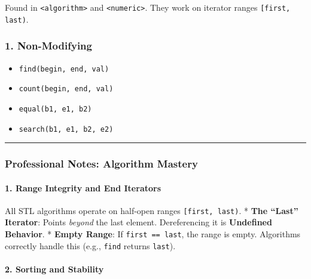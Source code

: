 Found in \passthrough{\lstinline!<algorithm>!} and
\passthrough{\lstinline!<numeric>!}. They work on iterator ranges
\passthrough{\lstinline![first, last)!}.

\hypertarget{non-modifying}{%
\subsubsection{1. Non-Modifying}\label{non-modifying}}

\begin{itemize}
\tightlist
\item
  \passthrough{\lstinline!find(begin, end, val)!}
\item
  \passthrough{\lstinline!count(begin, end, val)!}
\item
  \passthrough{\lstinline!equal(b1, e1, b2)!}
\item
  \passthrough{\lstinline!search(b1, e1, b2, e2)!}
\end{itemize}

\begin{center}\rule{0.5\linewidth}{0.5pt}\end{center}

\hypertarget{professional-notes-algorithm-mastery}{%
\subsubsection{Professional Notes: Algorithm
Mastery}\label{professional-notes-algorithm-mastery}}

\hypertarget{range-integrity-and-end-iterators}{%
\paragraph{1. Range Integrity and End
Iterators}\label{range-integrity-and-end-iterators}}

All STL algorithms operate on half-open ranges
\passthrough{\lstinline![first, last)!}. * \textbf{The ``Last''
Iterator}: Points \emph{beyond} the last element. Dereferencing it is
\textbf{Undefined Behavior}. * \textbf{Empty Range}: If
\passthrough{\lstinline!first == last!}, the range is empty. Algorithms
correctly handle this (e.g., \passthrough{\lstinline!find!} returns
\passthrough{\lstinline!last!}).

\hypertarget{sorting-and-stability}{%
\paragraph{2. Sorting and Stability}\label{sorting-and-stability}}

